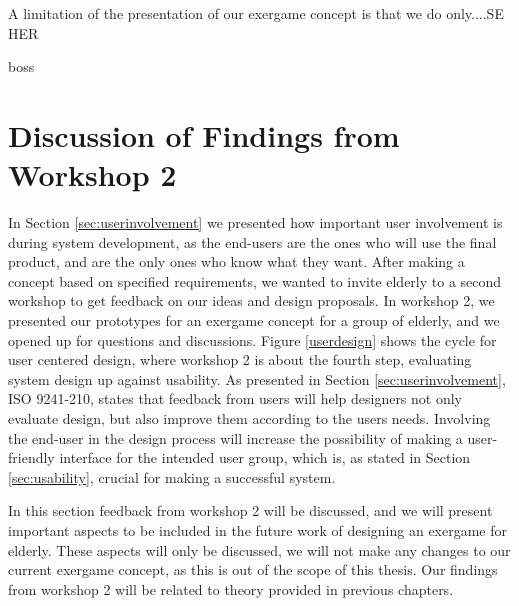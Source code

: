 A limitation of the presentation of our exergame concept is that we do only....SE HER

boss

\section{Discussion of Findings from Workshop 2}
\label{sec:discfindings2}
In Section \ref{sec:userinvolvement} we presented how important user involvement is during system development, as the end-users are the ones who will use the final product, and are the only ones who know what they want. After making a concept based on specified requirements, we wanted to invite elderly to a second workshop to get feedback on our ideas and design proposals. In workshop 2, we presented our prototypes for an exergame concept for a group of elderly, and we opened up for questions and discussions. Figure \ref{userdesign} shows the cycle for user centered design, where workshop 2 is about the fourth step, evaluating system design up against usability. As presented in Section \ref{sec:userinvolvement}, ISO 9241-210, states that feedback from users will help designers not only evaluate design, but also improve them according to the users needs. Involving the end-user in the design process will increase the possibility of making a user-friendly interface for the intended user group, which is, as stated in Section \ref{sec:usability}, crucial for making a successful system. 

In this section feedback from workshop 2 will be discussed, and we will present important aspects to be included in the future work of designing an exergame for elderly. These aspects will only be discussed, we will not make any changes to our current exergame concept, as this is out of the scope of this thesis. Our findings from workshop 2 will be related to theory provided in previous chapters.

